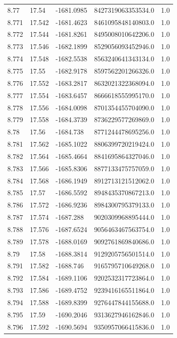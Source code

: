 \begin{tabular}{lllll}
8.77 & 17.54 & -1681.0985 & 8427319063353534.0 & 1.0 \\
8.771 & 17.542 & -1681.4623 & 8461095848140803.0 & 1.0 \\
8.772 & 17.544 & -1681.8261 & 8495008010642206.0 & 1.0 \\
8.773 & 17.546 & -1682.1899 & 8529056093452946.0 & 1.0 \\
8.774 & 17.548 & -1682.5538 & 8563240641343134.0 & 1.0 \\
8.775 & 17.55 & -1682.9178 & 8597562201266326.0 & 1.0 \\
8.776 & 17.552 & -1683.2817 & 8632021322368094.0 & 1.0 \\
8.777 & 17.554 & -1683.6457 & 8666618555995170.0 & 1.0 \\
8.778 & 17.556 & -1684.0098 & 8701354455704090.0 & 1.0 \\
8.779 & 17.558 & -1684.3739 & 8736229577269869.0 & 1.0 \\
8.78 & 17.56 & -1684.738 & 8771244478695256.0 & 1.0 \\
8.781 & 17.562 & -1685.1022 & 8806399720219424.0 & 1.0 \\
8.782 & 17.564 & -1685.4664 & 8841695864327046.0 & 1.0 \\
8.783 & 17.566 & -1685.8306 & 8877133475757059.0 & 1.0 \\
8.784 & 17.568 & -1686.1949 & 8912713121512062.0 & 1.0 \\
8.785 & 17.57 & -1686.5592 & 8948435370867213.0 & 1.0 \\
8.786 & 17.572 & -1686.9236 & 8984300795379133.0 & 1.0 \\
8.787 & 17.574 & -1687.288 & 9020309968895444.0 & 1.0 \\
8.788 & 17.576 & -1687.6524 & 9056463467563754.0 & 1.0 \\
8.789 & 17.578 & -1688.0169 & 9092761869840686.0 & 1.0 \\
8.79 & 17.58 & -1688.3814 & 9129205756501514.0 & 1.0 \\
8.791 & 17.582 & -1688.746 & 9165795710649268.0 & 1.0 \\
8.792 & 17.584 & -1689.1106 & 9202532317723864.0 & 1.0 \\
8.793 & 17.586 & -1689.4752 & 9239416165511864.0 & 1.0 \\
8.794 & 17.588 & -1689.8399 & 9276447844155688.0 & 1.0 \\
8.795 & 17.59 & -1690.2046 & 9313627946162846.0 & 1.0 \\
8.796 & 17.592 & -1690.5694 & 9350957066415836.0 & 1.0 \\

\end{tabular}
